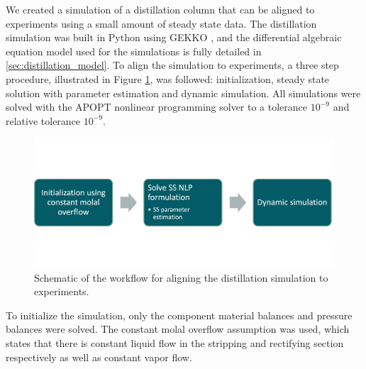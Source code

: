We created a simulation of a distillation column that can be aligned to experiments using a small amount of steady state data. The distillation simulation was built in Python using GEKKO \cite{Beal2018}, and the differential algebraic equation model used for the simulations is fully detailed in \ref{sec:distillation_model}. To align the simulation to experiments, a three step procedure, illustrated in Figure \ref{fig:simulation_workflow}, was followed: initialization, steady state solution with parameter estimation and dynamic simulation. All simulations were solved with the APOPT nonlinear programming solver to a tolerance $10^{-9}$ and relative tolerance $10^{-9}$.

\begin{figure}
    \centering
    \includegraphics[width=\textwidth]{gfx/Chapter06/simulation_workflow.png}
    \caption{Schematic of the workflow for aligning the distillation simulation to experiments.}
    \label{fig:simulation_workflow}
\end{figure}

To initialize  the simulation, only the component material balances and pressure balances were solved. The constant molal overflow assumption was used, which states that there is constant liquid flow in the stripping and rectifying section respectively as well as constant vapor flow. 

